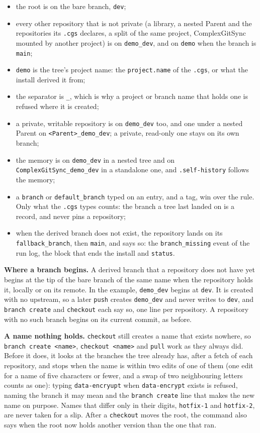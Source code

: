 \begin{itemize}
\item the root is on the bare branch, \texttt{dev};
\item every other repository that is not private (a library, a nested Parent
and the repositories its \texttt{.cgs} declares, a split of the same project,
ComplexGitSync mounted by another project) is on \texttt{demo\_dev}, and on
\texttt{demo} when the branch is \texttt{main};
\item \texttt{demo} is the tree's project name: the \texttt{project.name} of
the \texttt{.cgs}, or what the install derived it from;
\item the separator is \texttt{\_}, which is why a project or branch name that
holds one is refused where it is created;
\item a private, writable repository is on \texttt{demo\_dev} too, and one under
a nested Parent on \texttt{<Parent>\_demo\_dev}; a private, read-only one stays
on its own branch;
\item the memory is on \texttt{demo\_dev} in a nested tree and on
\texttt{ComplexGitSync\_demo\_dev} in a standalone one, and
\texttt{.self-history} follows the memory;
\item a \texttt{branch} or \texttt{default\_branch} typed on an entry, and a tag,
win over the rule. Only what the \texttt{.cgs} types counts: the branch a tree
last landed on is a record, and never pins a repository;
\item when the derived branch does not exist, the repository lands on its
\texttt{fallback\_branch}, then \texttt{main}, and says so: the
\texttt{branch\_missing} event of the run log, the block that ends the install
and \texttt{status}.
\end{itemize}

\textbf{Where a branch begins.} A derived branch that a repository does not have
yet begins at the tip of the bare branch of the same name when the repository
holds it, locally or on its remote. In the example, \texttt{demo\_dev} begins at
\texttt{dev}. It is created with no upstream, so a later \texttt{push} creates
\texttt{demo\_dev} and never writes to \texttt{dev}, and \texttt{branch create}
and \texttt{checkout} each say so, one line per repository. A repository with
no such branch begins on its current commit, as before.

\textbf{A name nothing holds.} \texttt{checkout} still creates a name that exists
nowhere, so \texttt{branch create <name>}, \texttt{checkout <name>} and
\texttt{pull} work as they always did. Before it does, it looks at the branches
the tree already has, after a fetch of each repository, and stops when the name
is within two edits of one of them (one edit for a name of five characters or
fewer, and a swap of two neighbouring letters counts as one): typing
\texttt{data-encryupt} when \texttt{data-encrypt} exists is refused, naming the
branch it may mean and the \texttt{branch create} line that makes the new name
on purpose. Names that differ only in their digits, \texttt{hotfix-1} and
\texttt{hotfix-2}, are never taken for a slip. After a \texttt{checkout} moves
the root, the command also says when the root now holds another
\cgscli{} version than the one that ran.

